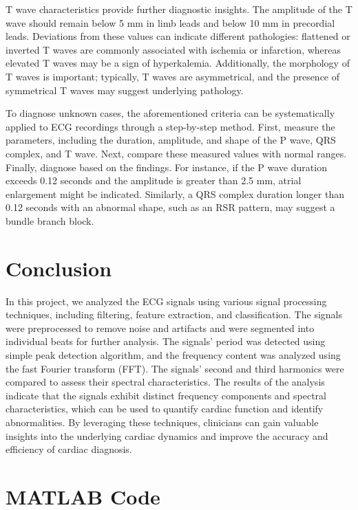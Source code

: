 \documentclass{zc-ust-hw}
\begin{document}
T wave characteristics provide further diagnostic insights. The amplitude of
the T wave should remain below 5 mm in limb leads and below 10 mm in precordial
leads. Deviations from these values can indicate different pathologies:
flattened or inverted T waves are commonly associated with ischemia or
infarction, whereas elevated T waves may be a sign of hyperkalemia.
Additionally, the morphology of T waves is important; typically, T waves are
asymmetrical, and the presence of symmetrical T waves may suggest underlying
pathology.

To diagnose unknown cases, the aforementioned criteria can be systematically
applied to ECG recordings through a step-by-step method. First, measure the
parameters, including the duration, amplitude, and shape of the P wave, QRS
complex, and T wave. Next, compare these measured values with normal ranges.
Finally, diagnose based on the findings. For instance, if the P wave duration
exceeds 0.12 seconds and the amplitude is greater than 2.5 mm, atrial
enlargement might be indicated. Similarly, a QRS complex duration longer than
0.12 seconds with an abnormal shape, such as an RSR pattern, may suggest a
bundle branch block.

\section{Conclusion}

In this project, we analyzed the ECG signals using various signal processing
techniques, including filtering, feature extraction, and classification. The
signals were preprocessed to remove noise and artifacts and were segmented into
individual beats for further analysis. The signals' period was detected using
simple peak detection algorithm, and the frequency content was analyzed using
the fast Fourier transform (FFT). The signals' second and third harmonics were
compared to assess their spectral characteristics. The results of the analysis
indicate that the signals exhibit distinct frequency components and spectral
characteristics, which can be used to quantify cardiac function and identify
abnormalities. By leveraging these techniques, clinicians can gain valuable
insights into the underlying cardiac dynamics and improve the accuracy and
efficiency of cardiac diagnosis.

\printbibliography[heading=bibnumbered]
\newpage

\appendix

\section{MATLAB Code}
\end{document}

